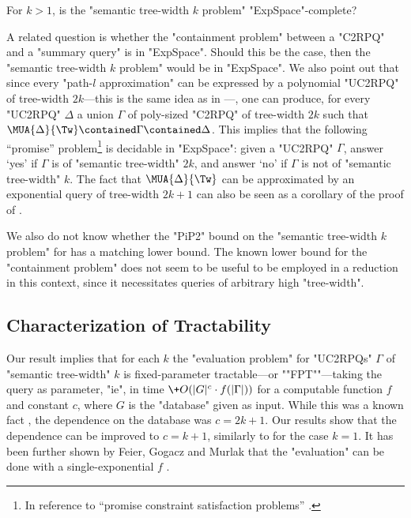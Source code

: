 \begin{question}
    For $k > 1$, is the "semantic tree-width $k$ problem" "ExpSpace"-complete?
\end{question}
A related question is whether the "containment problem" between a "C2RPQ" and a "summary query" is in "ExpSpace". Should this be the case, then the "semantic tree-width $k$ problem" would be in "ExpSpace".
We also point out that since every "path-$l$ approximation" can be expressed by a polynomial "UC2RPQ" of tree-width $2k$---this is the same idea as in \cite[Lemma IV.13]{RomeroBarceloVardi2017Homomorphism}---, one can produce, for every "UC2RPQ" $\Delta$ a union $\Gamma$ of poly-sized "C2RPQ" of tree-width $2k$ such that $ \MUA{\Delta}{\Tw} \contained \Gamma \contained \Delta$. This implies that the following ``promise'' problem\footnote{In reference to ``promise constraint satisfaction problems''
\cite[Definition 2.3]{BrakensiekGuruswami2021PCSP}.} is decidable in "ExpSpace": given a "UC2RPQ" $\Gamma$, answer `yes' if $\Gamma$ is of "semantic tree-width" $2k$, and answer `no' if $\Gamma$ is not of "semantic tree-width" $k$. The fact that $\MUA{\Delta}{\Tw}$ can be approximated by an exponential query of tree-width $2k+1$ can also be seen as a corollary of the proof of \cite[Theorem~V.1]{RomeroBarceloVardi2017Homomorphism}.

We also do not know whether the {"PiP2"} bound on the "semantic tree-width $k$ problem" for {\UCRPQSRE} has a matching lower bound. The known lower bound for the {\UCRPQSRE} "containment problem" \cite[Theorem~5.1]{FigueiraEtal2020Containment} does not seem to be useful to be employed in a reduction in this context, since it necessitates queries of arbitrary high "tree-width".

\subsection{\AP{}Characterization of Tractability}
\label{sec:charact-tractability}

Our result implies that for each $k$
the "evaluation problem" for "UC2RPQs" $\Gamma$
of "semantic tree-width" $k$ is fixed-parameter tractable---or \AP""FPT""---taking
the query as parameter, "ie", in time $\+O(|G|^{c} \cdot f(|\Gamma|))$
for a computable function $f$ and constant $c$, where $G$ is the "database" given as input.
%
While this was a known fact \cite[Corollary IV.12]{RomeroBarceloVardi2017Homomorphism}, the dependence on the database was $c=2k+1$.  Our results show that the dependence can be improved to $c=k+1$, similarly to \cite[Theorem 6.3]{BarceloRomeroVardi2016SemanticAcyclicity} for the case $k=1$.
It has been further shown by Feier, Gogacz and Murlak that the "evaluation" can be done with a single-exponential $f$ \cite[Theorem~22]{FeierGogaczMurlak24Treewidth}.

